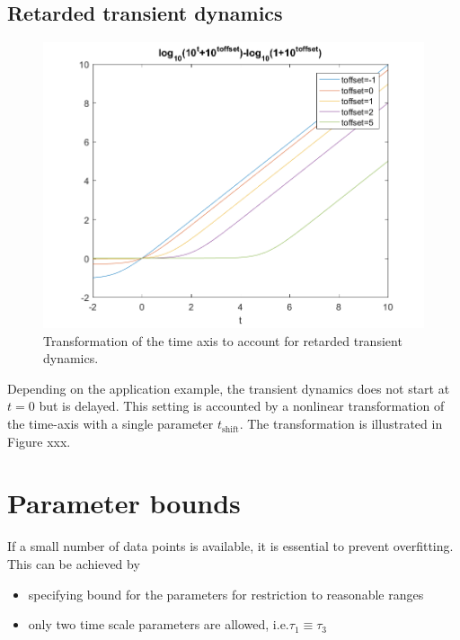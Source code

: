 \documentclass[pdftex, a4paper]{scrartcl}	%
\begin{document}
\subsection{Retarded transient dynamics}
\begin{figure}[!t]
\begin{center}
\includegraphics{TimeOffset_TransientFunction.png}
\end{center}
\caption{Transformation of the time axis to account for retarded transient dynamics. \label{fig:retarded}}
\end{figure} 

Depending on the application example, the transient dynamics does not start at $t=0$ but is delayed.
This setting is accounted by a nonlinear transformation of the time-axis with a single parameter $t_\text{shift}$.
The transformation is illustrated in Figure xxx.


\section{Parameter bounds}
If a small number of data points is available, it is essential to prevent overfitting.
This can be achieved by 
\begin{itemize}
\item 	specifying bound for the parameters for restriction to reasonable ranges
\item  only two time scale parameters are allowed, i.e.$\tau_1\equiv\tau_3$
\end{itemize}
\end{document}
